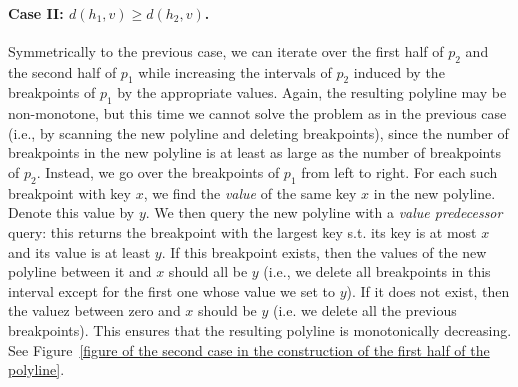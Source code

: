 \documentclass[11pt,a4paper]{article}
\theoremstyle{definition}
\theoremstyle{remark}
\begin{document}
\paragraph{Case II: \boldmath$d(h_1,v) \ge d(h_2,v)$.}
Symmetrically to the previous case, we can iterate over the first half of $p_2$ and the second half of $p_1$ while increasing the intervals of $p_2$ induced by the breakpoints of $p_1$ by the appropriate values. Again, the resulting polyline may be non-monotone, but this time we cannot solve the problem as in the previous case (i.e., by scanning the new polyline and deleting breakpoints), since the number of breakpoints in the new polyline is at least as large as the number of breakpoints of $p_2$. Instead, we go over the breakpoints of $p_1$ from left to right. For each such breakpoint  with key $x$, we find the {\em value} of the same key $x$ in the new polyline. Denote this value by $y$. We then query the new polyline with a \emph{value predecessor} query: this returns the breakpoint   with the largest key s.t. its key is at most $x$ and its value is at least $y$. 
%
If this breakpoint exists, then the values of the new polyline between it and $x$ should all be $y$ (i.e., we delete all breakpoints in this interval except for the first one whose value we set to $y$). %
If it does not exist, then the valuez between zero and $x$ should be $y$ (i.e. we delete all the previous breakpoints). 
This ensures that the resulting polyline is monotonically decreasing. 
See  Figure~\ref{figure of the second case in the construction of the first half of the polyline}.
\end{document}
